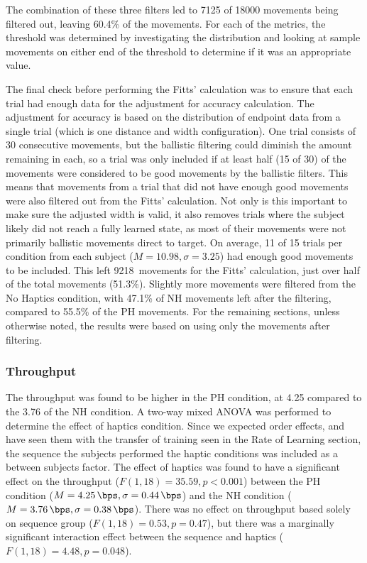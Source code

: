 The combination of these three filters led to 7125 of 18000 movements being filtered out, leaving 60.4\% of the movements.
For each of the metrics, the threshold was determined by investigating the distribution and looking at sample movements on either end of the threshold to determine if it was an appropriate value.

The final check before performing the Fitts' calculation was to ensure that each trial had enough data for the adjustment for accuracy calculation.
The adjustment for accuracy is based on the distribution of endpoint data from a single trial (which is one distance and width configuration).
One trial consists of 30 consecutive movements, but the ballistic filtering could diminish the amount remaining in each, so a trial was only included if at least half (15 of 30) of the movements were considered to be good movements by the ballistic filters.
This means that movements from a trial that did not have enough good movements were also filtered out from the Fitts' calculation.
Not only is this important to make sure the adjusted width is valid, it also removes trials where the subject likely did not reach a fully learned state, as most of their movements were not primarily ballistic movements direct to target.
On average, 11 of 15 trials per condition from each subject ($M=10.98, \sigma=3.25$) had enough good movements to be included.
This left 9218~movements for the Fitts' calculation, just over half of the total movements (51.3\%).
Slightly more movements were filtered from the No Haptics condition, with 47.1\% of NH movements left after the filtering, compared to 55.5\% of the PH movements.
For the remaining sections, unless otherwise noted, the results were based on using only the movements after filtering.

\subsubsection{Throughput}

The throughput was found to be higher in the PH condition, at \SI{4.25}{\bps} compared to the \SI{3.76}{\bps} of the NH condition.
A two-way mixed ANOVA was performed to determine the effect of haptics condition.
Since we expected order effects, and have seen them with the transfer of training seen in the Rate of Learning section, the sequence the subjects performed the haptic conditions was included as a between subjects factor.
The effect of haptics was found to have a significant effect on the throughput ($F(1,18)=35.59, p<0.001$) between the PH condition ($M=\SI{4.25}{\bps}, \sigma=\SI{0.44}{\bps}$) and the NH condition ($M=\SI{3.76}{\bps}, \sigma=\SI{0.38}{\bps}$).
There was no effect on throughput based solely on sequence group ($F(1,18)=0.53, p=0.47$), but there was a marginally significant interaction effect between the sequence and haptics ($F(1,18)=4.48, p=0.048$).

